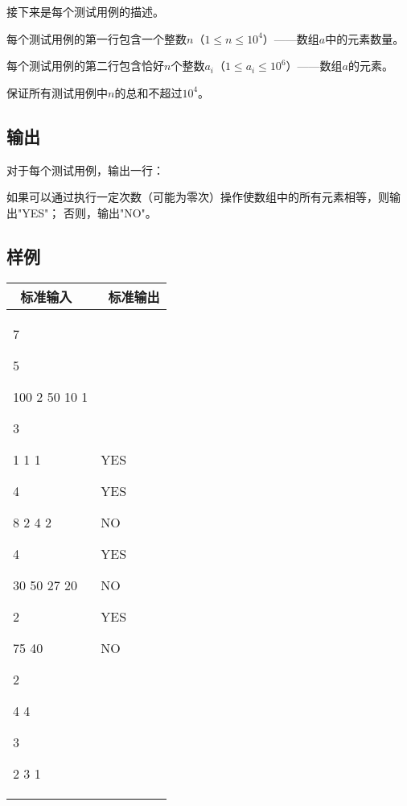 \documentclass{article}
\begin{document}
接下来是每个测试用例的描述。

每个测试用例的第一行包含一个整数$n$（$1 \le n \le 10^4$）——数组$a$中的元素数量。

每个测试用例的第二行包含恰好$n$个整数$a_i$（$1 \le a_i \le 10^6$）——数组$a$的元素。

保证所有测试用例中$n$的总和不超过$10^4$。
\subsection*{\textsf{输出}}
对于每个测试用例，输出一行：

如果可以通过执行一定次数（可能为零次）操作使数组中的所有元素相等，则输出"YES"；
否则，输出"NO"。

\noindent
\subsection*{\textsf{样例}}
\noindent
\begin{tabular}{| p{7cm} | p{7cm} |}
	\hline
	{\quad\quad\quad\quad\quad\quad\quad\  标准输入} & {\quad\quad\quad\quad\quad\quad\quad\  标准输出} \\
	\hline
	7

	5

	100 2 50 10 1

	3

	1 1 1

	4

	8 2 4 2

	4

	30 50 27 20

	2

	75 40

	2

	4 4

	3

	2 3 1                                        & YES

    YES
	
    NO
	
    YES
	
    NO
	
    YES
	
    NO                                                                                          \\
	\hline
\end{tabular}
\end{document}
